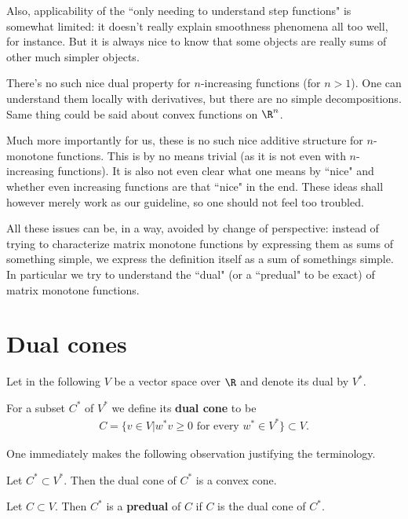 Also, applicability of the ``only needing to understand step functions" is somewhat limited: it doesn't really explain smoothness phenomena all too well, for instance. But it is always nice to know that some objects are really sums of other much simpler objects.

There's no such nice dual property for $n$-increasing functions (for $n > 1$). One can understand them locally with derivatives, but there are no simple decompositions. Same thing could be said about convex functions on $\R^n$.

Much more importantly for us, these is no such nice additive structure for $n$-monotone functions. This is by no means trivial (as it is not even with $n$-increasing functions). It is also not even clear what one means by ``nice" and whether even increasing functions are that ``nice" in the end. These ideas shall however merely work as our guideline, so one should not feel too troubled.

All these issues can be, in a way, avoided by change of perspective: instead of trying to characterize matrix monotone functions by expressing them as sums of something simple, we express the definition itself as a sum of somethings simple. In particular we try to understand the ``dual" (or a ``predual" to be exact) of matrix monotone functions.

\section{Dual cones}

Let in the following $V$ be a vector space over $\R$ and denote its dual by $V^{*}$.

\begin{maar}
	For a subset $C^{*}$ of $V^{*}$ we define its \textbf{dual cone} to be
	\begin{align*}
		C = \{v \in V | w^{*} v \geq 0 \text{ for every $w^{*} \in V^{*}$}\} \subset V.
	\end{align*}
\end{maar}

One immediately makes the following observation justifying the terminology.

\begin{lause}\label{dual_cone}
	Let $C^{*} \subset V^{*}$. Then the dual cone of $C^{*}$ is a convex cone.
\end{lause}

\begin{maar}
	Let $C \subset V$. Then $C^{*}$ is a \textbf{predual} of $C$ if $C$ is the dual cone of $C^{*}$.
\end{maar}

